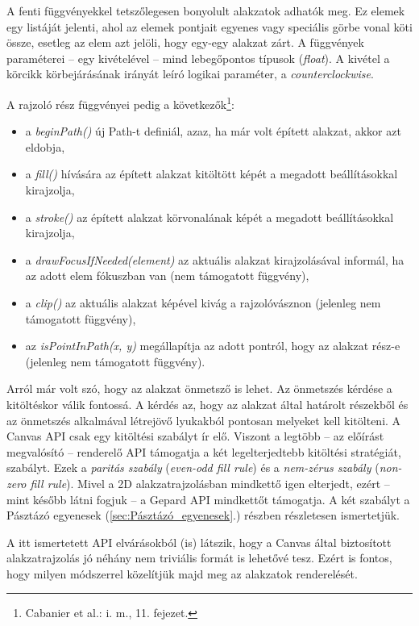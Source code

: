 \documentclass[12pt]{report}
\theoremstyle{definition}
\newcommand{\inenglish}[1]{\textsl{#1}}
\newcommand{\func}[1]{{\textsl{#1}}}
\begin{document}
A fenti függvényekkel tetszőlegesen bonyolult alakzatok adhatók meg. Ez elemek
egy listáját jelenti, ahol az elemek pontjait egyenes vagy speciális görbe
vonal köti össze, esetleg az elem azt jelöli, hogy egy-egy alakzat zárt. A
függvények paraméterei -- egy kivételével -- mind lebegőpontos típusok
(\func{float}). A kivétel a körcikk körbejárásának irányát leíró logikai
paraméter, a \func{counterclockwise}.

A rajzoló rész függvényei pedig a következők\footnote{Cabanier et al.: i.
m., 11. fejezet.}:
\begin{itemize}
  \item a \func{beginPath()} új Path-t definiál, azaz, ha már volt épített
  alakzat, akkor azt eldobja,
  \item a \func{fill()} hívására az épített alakzat kitöltött képét a
  megadott beállításokkal kirajzolja,
  \item a \func{stroke()} az épített alakzat körvonalának képét a
  megadott beállításokkal kirajzolja,
  \item a \func{drawFocusIfNeeded(element)} az aktuális alakzat kirajzolásával
   informál, ha az adott elem fókuszban van (nem támogatott függvény),
  \item a \func{clip()} az aktuális alakzat képével kivág a
  rajzolóvásznon (jelenleg nem támogatott függvény),
  \item az \func{isPointInPath(x, y)} megállapítja az adott pontról, hogy az
  alakzat rész-e (jelenleg nem támogatott függvény).
\end{itemize}

Arról már volt szó, hogy az alakzat önmetsző is lehet. Az önmetszés kérdése a
kitöltéskor válik fontossá. A kérdés az, hogy az alakzat által határolt
részekből és az önmetszés alkalmával létrejövő lyukakból pontosan melyeket kell
kitölteni. A Canvas API csak egy kitöltési szabályt ír elő. Viszont a legtöbb
-- az előírást megvalósító -- renderelő API támogatja a két legelterjedtebb
kitöltési stratégiát, szabályt. Ezek a \emph{paritás szabály}
(\inenglish{even-odd fill rule}) és a \emph{nem-zérus szabály}
(\inenglish{non-zero fill rule}). Mivel a 2D alakzatrajzolásban mindkettő igen
elterjedt, ezért -- mint később látni fogjuk -- a Gepard API mindkettőt
támogatja. A két szabályt a Pásztázó egyenesek (\ref{sec:Pásztázó_egyenesek}.)
részben részletesen ismertetjük.

A itt ismertetett API elvárásokból (is) látszik, hogy a Canvas által
biztosított alakzatrajzolás jó néhány nem triviális formát is lehetővé tesz.
Ezért is fontos, hogy milyen módszerrel közelítjük majd meg az alakzatok
renderelését.
\end{document}
